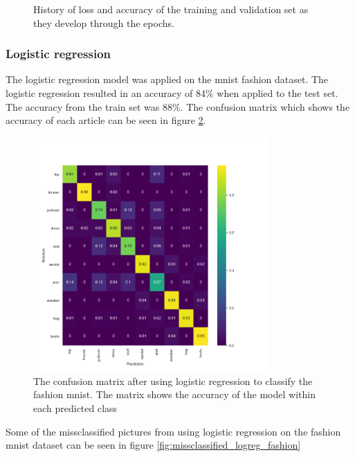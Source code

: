 \documentclass[../main.tex]{subfiles}
\begin{document}
\begin{figure}[H]
\begin{subfigure}{.5\textwidth}
    \end{subfigure}
    \caption{History of loss and accuracy of the training and validation set as they develop through the epochs.}
    \label{fig:fashion_mnist_cnn_history}
\end{figure}


\subsubsection{Logistic regression}
The logistic regression model was applied on the mnist fashion dataset. The logistic regression resulted in an accuracy of 84\% when applied to the test set. The accuracy from the train set was 88\%. The confusion matrix which shows the accuracy of each article can be seen in figure \ref{fig:logreg_mnist_cm}.
\begin{figure}[H]
    \centering
    \includegraphics[width=0.8\textwidth]{doc/assets/logreg_fashion_heatmap_accuracy84.png}
    \caption{The confusion matrix after using logistic regression to classify the fashion mnist. The matrix shows the accuracy of the model within each predicted class}
    \label{fig:logreg_mnist_cm}
\end{figure}

Some of the missclassified pictures from using logistic regression on the fashion mnist dataset can be seen in figure \ref{fig:missclassified_logreg_fashion}
\end{document}
